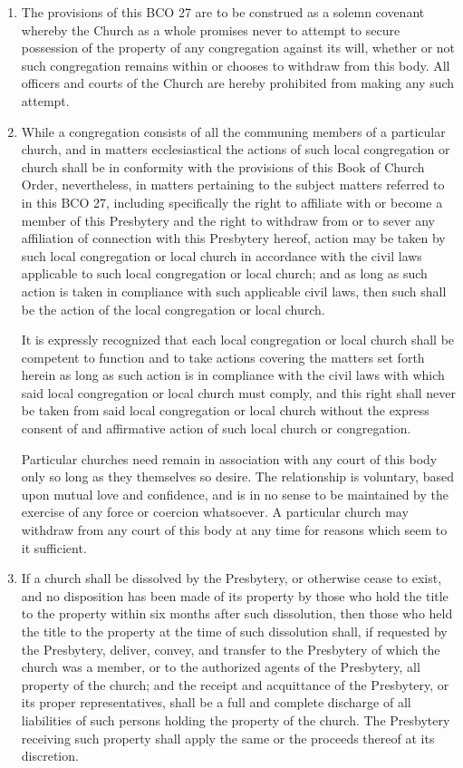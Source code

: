 \documentclass[
]{book}
\begin{document}
\begin{enumerate}
\item
  The provisions of this BCO 27 are to be construed as a solemn covenant whereby the Church as a whole promises never to attempt to secure possession of the property of any congregation against its will, whether or not such congregation remains within or chooses to withdraw from this body. All officers and courts of the Church are hereby prohibited from making any such attempt.
\item
  While a congregation consists of all the communing members of a particular church, and in matters ecclesiastical the actions of such local congregation or church shall be in conformity with the provisions of this Book of Church Order, nevertheless, in matters pertaining to the subject matters referred to in this BCO 27, including specifically the right to affiliate with or become a member of this Presbytery and the right to withdraw from or to sever any affiliation of connection with this Presbytery hereof, action may be taken by such local congregation or local church in accordance with the civil laws applicable to such local congregation or local church; and as long as such action is taken in compliance with such applicable civil laws, then such shall be the action of the local congregation or local church.

  It is expressly recognized that each local congregation or local church shall be competent to function and to take actions covering the matters set forth herein as long as such action is in compliance with the civil laws with which said local congregation or local church must comply, and this right shall never be taken from said local congregation or local church without the express consent of and affirmative action of such local church or congregation.

  Particular churches need remain in association with any court of this body only so long as they themselves so desire. The relationship is voluntary, based upon mutual love and confidence, and is in no sense to be maintained by the exercise of any force or coercion whatsoever. A particular church may withdraw from any court of this body at any time for reasons which seem to it sufficient.
\item
  If a church shall be dissolved by the Presbytery, or otherwise cease to exist, and no disposition has been made of its property by those who hold the title to the property within six months after such dissolution, then those who held the title to the property at the time of such dissolution shall, if requested by the Presbytery, deliver, convey, and transfer to the Presbytery of which the church was a member, or to the authorized agents of the Presbytery, all property of the church; and the receipt and acquittance of the Presbytery, or its proper representatives, shall be a full and complete discharge of all liabilities of such persons holding the property of the church. The Presbytery receiving such property shall apply the same or the proceeds thereof at its discretion.
\end{enumerate}
\end{document}
